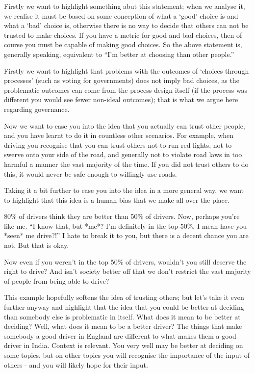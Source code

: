 \documentclass[twoside]{article}
\theoremstyle{definition}
\begin{document}
Firstly we want to highlight something abut this statement; when we analyse it, we realise it must be based on some conception of what a ‘good’ choice is and what a ‘bad’ choice is, otherwise there is no way to decide that others can not be trusted to make choices. If you have a metric for good and bad choices, then of course you must be capable of making good choices. So the above statement is, generally speaking, equivalent to “I’m better at choosing than other people.”

Firstly we want to highlight that problems with the outcomes of ‘choices through processes’ (such as voting for governments) does not imply bad choices, as the problematic outcomes can come from the process design itself (if the process was different you would see fewer non-ideal outcomes); that is what we argue here regarding governance.

Now we want to ease you into the idea that you actually can trust other people, and you have learnt to do it in countless other scenarios. For example, when driving you recognise that you can trust others not to run red lights, not to swerve onto your side of the road, and generally not to violate road laws in too harmful a manner the vast majority of the time. If you did not trust others to do this, it would never be safe enough to willingly use roads.

Taking it a bit further to ease you into the idea in a more general way, we want to highlight that this idea is a human bias that we make all over the place.

80\% of drivers think they are better than 50\% of drivers. Now, perhaps you’re like me. “I know that, but *me*? I’m definitely in the top 50\%, I mean have you *seen* me drive?!” I hate to break it to you, but there is a decent chance you are not. But that is okay.

Now even if you weren’t in the top 50\% of drivers, wouldn’t you still deserve the right to drive? And isn’t society better off that we don’t restrict the vast majority of people from being able to drive?

This example hopefully softens the idea of trusting others; but let’s take it even further anyway and highlight that the idea that you could be better at deciding than somebody else is problematic in itself. What does it mean to be better at deciding? Well, what does it mean to be a better driver? The things that make somebody a good driver in England are different to what makes them a good driver in India. Context is relevant. You very well may be better at deciding on some topics, but on other topics you will recognise the importance of the input of others - and you will likely hope for their input.
\end{document}
